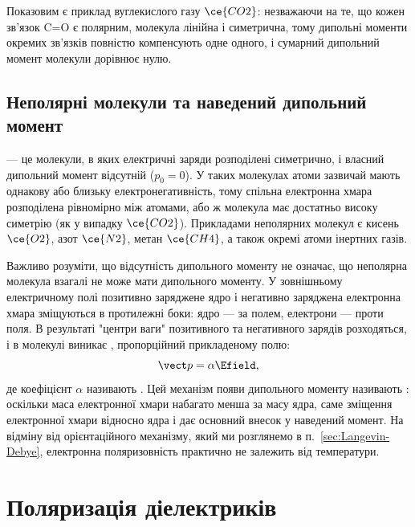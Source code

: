 Показовим є приклад вуглекислого газу $\ce{CO2}$: незважаючи на те, що кожен зв'язок C=O є полярним, молекула лінійна і симетрична, тому дипольні
моменти окремих зв'язків повністю компенсують одне одного, і сумарний дипольний момент молекули дорівнює нулю.

\subsection*{Неполярні молекули та наведений дипольний момент}

\begin{Attention}
	 --- це молекули, в яких електричні заряди розподілені симетрично, і власний дипольний момент відсутній ($p_0 = 0$).
	У таких молекулах атоми зазвичай мають однакову або близьку електронегативність, тому спільна електронна хмара розподілена рівномірно між
	атомами, або ж молекула має достатньо високу симетрію (як у випадку $\ce{CO2}$). Прикладами неполярних молекул є кисень $\ce{O2}$, азот
	$\ce{N2}$, метан $\ce{CH4}$, а також окремі атоми інертних газів.
\end{Attention}

Важливо розуміти, що відсутність  дипольного моменту не означає, що неполярна молекула взагалі не може мати дипольного моменту. У
зовнішньому електричному полі позитивно заряджене ядро і негативно заряджена електронна хмара зміщуються в протилежні боки: ядро --- за полем,
електрони --- проти поля. В результаті "центри ваги" позитивного та негативного зарядів розходяться, і в молекулі виникає , пропорційний прикладеному полю:
\begin{equation}\label{eq:InducedDipole}
	\vect p = \alpha \Efield,
\end{equation}
де коефіцієнт $\alpha$ називають . Цей механізм появи дипольного моменту називають : оскільки маса електронної хмари набагато менша за масу ядра, саме зміщення електронної хмари відносно ядра і дає
основний внесок у наведений момент. На відміну від орієнтаційного механізму, який ми розглянемо в п.~\ref{sec:Langevin-Debye}, електронна
поляризовність практично не залежить від температури.

\section{Поляризація діелектриків}

